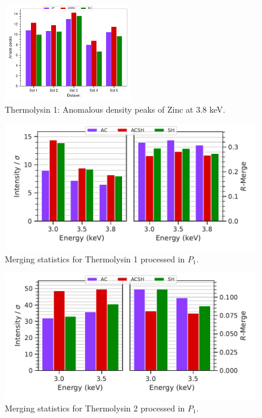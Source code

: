 \begin{figure}
    \centering
    \includegraphics[width = 0.5\textwidth]{plots/exp1/tlys_9_P6122/peaks/3p8_zinc.pdf}
    \caption{Thermolysin 1: Anomalous density peaks of Zinc at 3.8 \unit{keV}.}
    \label{fig:tlys9_zn_peaks_3p8}
\end{figure}


\begin{figure}[]
    \centering
    \includegraphics{plots/exp1/tlys_9_P1/merged_stats.pdf}
    \caption{Merging statistics for Thermolysin 1 processed in $P_1$.}
    \label{fig:tlys_9_p1}
\end{figure}

\begin{figure}[]
    \centering
    \includegraphics{plots/exp1/tlys_2_P1/stats.pdf}
    \caption{Merging statistics for Thermolysin 2 processed in $P_1$.}
    \label{fig:tlys_2_p1}
\end{figure}




